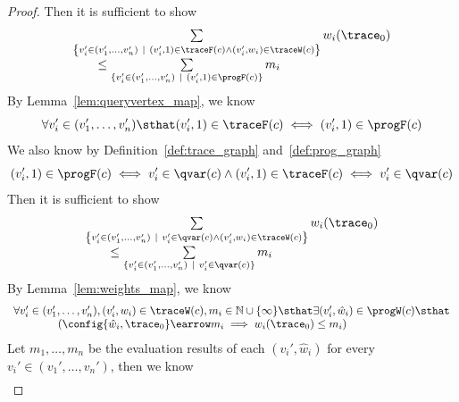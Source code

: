 \begin{proof}
Then it is sufficient to show
	\[
		\begin{array}{l}
			\sum\limits_{\left\{
				v_i' \in (v_1', \ldots, v_n') ~\vert~ (v_i', 1) \in \traceF(c) \land (v_i', w_i) \in \traceW(c) 
		\right\}} w_i(\trace_0)
		\\ \qquad \leq 
		\sum\limits_{ 
		\{ v_i' \in (v_1', \ldots, v_n') ~\vert~  (v_i', 1) \in \progF(c) \} } m_i
		\end{array}
	\]
	By Lemma~\ref{lem:queryvertex_map}, we know 
	\[
		\forall v_i' \in (v_1', \ldots, v_n')
		\sthat
		(v_i', 1) \in \traceF(c) \iff  (v_i', 1) \in \progF(c)		
		\]
	We also know by Definition~\ref{def:trace_graph} and~\ref{def:prog_graph}
	\[
		(v_i', 1) \in \progF(c) \iff v_i' \in \qvar(c)
		\land 
		(v_i', 1) \in \traceF(c) \iff v_i' \in \qvar(c)
	\]
	Then it is sufficient to show
	\[
		\begin{array}{l}
			\sum\limits_{\left\{v_i' \in (v_1', \ldots, v_n') ~\vert~ v_i' \in \qvar(c)\land (v_i', w_i) \in \traceW(c) 
		\right\}} w_i(\trace_0)
		\\ \qquad \leq 
		\sum\limits_{ 
		\{ v_i' \in (v_1', \ldots, v_n') ~\vert~  v_i' \in \qvar(c) \} } m_i
		\end{array}
	\]
By Lemma~\ref{lem:weights_map}, we know
\[
	\begin{array}{l}
\forall v_i' \in (v_1', \ldots, v_n'), (v_i', w_i) \in \traceW(c), m_i \in \mathbb{N} \cup \{\infty\}  \sthat
  \exists (v_i', \hat{w}_i) \in \progW(c)
  \sthat 
  \\ \qquad \qquad
  (\config{\hat{w}_i, \trace_0} \earrow m_i
  \implies  w_i(\trace_0) \leq m_i)
\end{array}
\]
Let $m_1, \ldots, m_n$ be the evaluation results of each
$(v_i', \hat{w}_i)$ for every $v_i' \in (v_1', \ldots, v_n')$,
then we know 
\[
	\begin{array}{l}

\end{array}\]
\end{proof}
